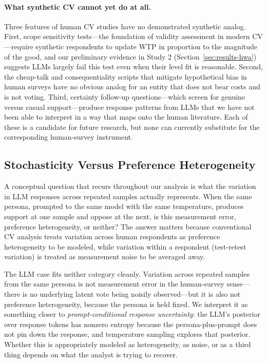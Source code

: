 \documentclass[12pt]{article}
\begin{document}
\paragraph{What synthetic CV cannot yet do at all.} Three features of human CV studies have no demonstrated synthetic analog. First, scope sensitivity tests---the foundation of validity assessment in modern CV \parencite{Johnston2017}---require synthetic respondents to update WTP in proportion to the magnitude of the good, and our preliminary evidence in Study 2 (Section~\ref{sec:results-hwa}) suggests LLMs largely fail this test even when their level fit is reasonable. Second, the cheap-talk and consequentiality scripts that mitigate hypothetical bias in human surveys have no obvious analog for an entity that does not bear costs and is not voting. Third, certainty follow-up questions---which screen for genuine versus casual support---produce response patterns from LLMs that we have not been able to interpret in a way that maps onto the human literature. Each of these is a candidate for future research, but none can currently substitute for the corresponding human-survey instrument.

\subsection{Stochasticity Versus Preference Heterogeneity}\label{sec:disc-stochasticity}

A conceptual question that recurs throughout our analysis is what the variation in LLM responses across repeated samples actually represents. When the same persona, prompted to the same model with the same temperature, produces support at one sample and oppose at the next, is this measurement error, preference heterogeneity, or neither? The answer matters because conventional CV analysis treats variation across human respondents as preference heterogeneity to be modeled, while variation within a respondent (test-retest variation) is treated as measurement noise to be averaged away.

The LLM case fits neither category cleanly. Variation across repeated samples from the same persona is not measurement error in the human-survey sense---there is no underlying latent vote being noisily observed---but it is also not preference heterogeneity, because the persona is held fixed. We interpret it as something closer to \emph{prompt-conditional response uncertainty}: the LLM's posterior over response tokens has nonzero entropy because the persona-plus-prompt does not pin down the response, and temperature sampling explores that posterior. Whether this is appropriately modeled as heterogeneity, as noise, or as a third thing depends on what the analyst is trying to recover.
\end{document}
